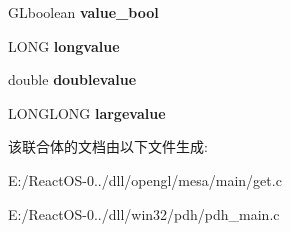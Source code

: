 \begin{DoxyCompactItemize}
\begin{tabbing}
\end{tabbing}\item 
\mbox{\label{unionvalue_a6d0fbdeb6119e9bfb2a5145ab9e47ae9}} 
G\+Lboolean {\bfseries value\+\_\+bool}
\item 
\mbox{\label{unionvalue_a94c2f4588feb08eb05f27045579f63d2}} 
L\+O\+NG {\bfseries longvalue}
\item 
\mbox{\label{unionvalue_ae0397e580c8f1e39e95cf4a5a88ea0e1}} 
double {\bfseries doublevalue}
\item 
\mbox{\label{unionvalue_a52574c17fa44f676be92cf1a8284ec4c}} 
L\+O\+N\+G\+L\+O\+NG {\bfseries largevalue}
\end{DoxyCompactItemize}


该联合体的文档由以下文件生成\+:\begin{DoxyCompactItemize}
\item 
E\+:/\+React\+O\+S-\/0../dll/opengl/mesa/main/get.\+c\item 
E\+:/\+React\+O\+S-\/0../dll/win32/pdh/pdh\+\_\+main.\+c\end{DoxyCompactItemize}
